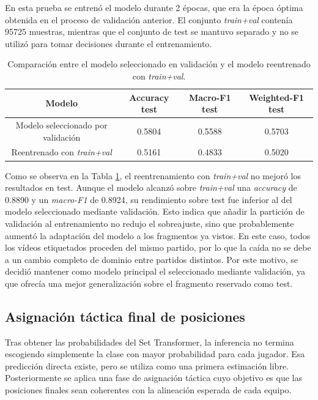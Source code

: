 En esta prueba se entrenó el modelo durante 2 épocas, que era la época óptima obtenida en el proceso de validación anterior. El conjunto \textit{train+val} contenía 95725 muestras, mientras que el conjunto de test se mantuvo separado y no se utilizó para tomar decisiones durante el entrenamiento.

\begin{table}[H]
    \centering
    \begin{tabular}{c|c|c|c}
        \textbf{Modelo} & \textbf{Accuracy test} & \textbf{Macro-F1 test} & \textbf{Weighted-F1 test} \\
        \hline\hline
        Modelo seleccionado por validación & 0.5804 & 0.5588 & 0.5703 \\
        Reentrenado con \textit{train+val} & 0.5161 & 0.4833 & 0.5020 \\
        \hline
    \end{tabular}
    \caption{Comparación entre el modelo seleccionado en validación y el modelo reentrenado con \textit{train+val}.}
    \label{tab:comparacion_train_val_posiciones}
\end{table}

Como se observa en la Tabla \ref{tab:comparacion_train_val_posiciones}, el reentrenamiento con \textit{train+val} no mejoró los resultados en test. Aunque el modelo alcanzó sobre \textit{train+val} una \textit{accuracy} de 0.8890 y un \textit{macro-F1} de 0.8924, su rendimiento sobre test fue inferior al del modelo seleccionado mediante validación. Esto indica que añadir la partición de validación al entrenamiento no redujo el sobreajuste, sino que probablemente aumentó la adaptación del modelo a los fragmentos ya vistos. En este caso, todos los vídeos etiquetados proceden del mismo partido, por lo que la caída no se debe a un cambio completo de dominio entre partidos distintos. Por este motivo, se decidió mantener como modelo principal el seleccionado mediante validación, ya que ofrecía una mejor generalización sobre el fragmento reservado como test.


\subsection{Asignación táctica final de posiciones}

Tras obtener las probabilidades del Set Transformer, la inferencia no termina escogiendo simplemente la clase con mayor probabilidad para cada jugador. Esa predicción directa existe, pero se utiliza como una primera estimación libre. Posteriormente se aplica una fase de asignación táctica cuyo objetivo es que las posiciones finales sean coherentes con la alineación esperada de cada equipo.


